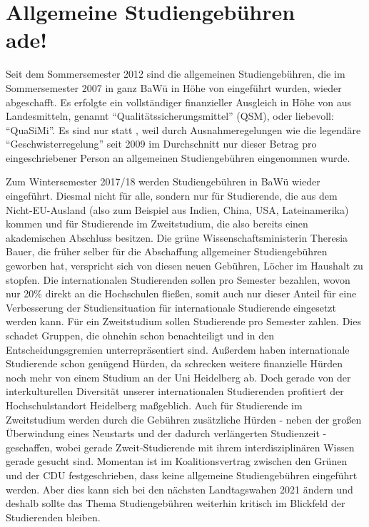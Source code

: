 \section[Allgemeine Studiengebühren ade]{Allgemeine Studiengebühren \\ade!}
Seit dem Sommersemester 2012 sind die allgemeinen Studiengebühren, die im Sommersemester 2007 in ganz BaWü in Höhe von  eingeführt wurden, wieder abgeschafft. Es erfolgte ein vollständiger finanzieller Ausgleich in Höhe von  aus Landesmitteln, genannt “Qualitätssicherungsmittel” (QSM), oder liebevoll: “QuaSiMi”. Es sind nur  statt , weil durch Ausnahmeregelungen wie die legendäre “Geschwisterregelung” seit 2009 im Durchschnitt nur dieser Betrag pro eingeschriebener Person an allgemeinen Studiengebühren eingenommen wurde.

Zum Wintersemester 2017/18 werden Studiengebühren in BaWü wieder eingeführt. Diesmal nicht für alle, sondern nur für Studierende, die aus dem Nicht-EU-Ausland (also zum Beispiel aus Indien, China, USA, Lateinamerika) kommen und für Studierende im Zweitstudium, die also bereits einen akademischen Abschluss besitzen. Die grüne Wissenschaftsministerin Theresia Bauer, die früher selber für die Abschaffung allgemeiner Studiengebühren geworben hat, verspricht sich von diesen neuen Gebühren, Löcher im Haushalt zu stopfen. Die internationalen Studierenden sollen  pro Semester bezahlen, wovon nur 20\% direkt an die Hochschulen fließen, somit auch nur dieser Anteil für eine Verbesserung der Studiensituation für internationale Studierende eingesetzt werden kann. Für ein Zweitstudium sollen Studierende  pro Semester zahlen. Dies schadet Gruppen, die ohnehin schon benachteiligt und in den Entscheidungsgremien unterrepräsentiert sind. Außerdem haben internationale Studierende schon genügend Hürden, da schrecken weitere finanzielle Hürden noch mehr von einem Studium an der Uni Heidelberg ab. Doch gerade von der interkulturellen Diversität unserer internationalen Studierenden profitiert der Hochschulstandort Heidelberg maßgeblich. Auch für Studierende im Zweitstudium werden durch die Gebühren zusätzliche Hürden - neben der großen Überwindung eines Neustarts und der dadurch verlängerten Studienzeit - geschaffen, wobei gerade Zweit-Studierende mit ihrem interdisziplinären Wissen gerade gesucht sind. Momentan ist im Koalitionsvertrag zwischen den Grünen und der CDU festgeschrieben, dass keine allgemeine Studiengebühren eingeführt werden. Aber dies kann sich bei den nächsten Landtagswahen 2021 ändern und deshalb sollte das Thema Studiengebühren weiterhin kritisch im Blickfeld der Studierenden bleiben.

